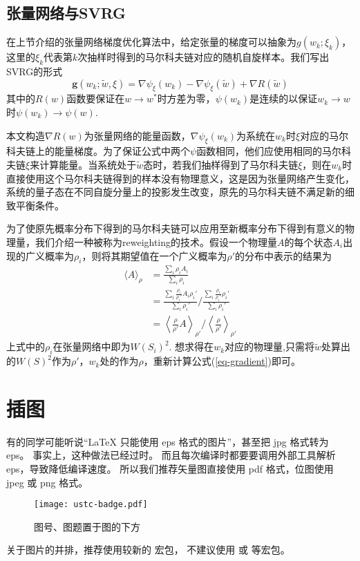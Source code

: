 \subsection{张量网络与SVRG}

在上节介绍的张量网络梯度优化算法中，给定张量的梯度可以抽象为$g(w_k;\xi_k)$，这里的$\xi_k$代表第$k$次抽样时得到的马尔科夫链对应的随机自旋样本。我们写出SVRG的形式
\begin{equation}\label{key}
\symbf{g}(w_k;\tilde{w},\xi)=\nabla\psi_{\xi}(w_{k})-\nabla\psi_{\xi}(\tilde{w}) + \nabla R(\tilde{w})
\end{equation}
其中的$R(w)$函数要保证在$w\to w^*$时方差为零，$\psi(w_k)$是连续的以保证$w_k\to w$时$\psi(w_k)\to\psi(w)$. 

本文构造$\nabla R(w)$为张量网络的能量函数，$\nabla\psi_{\xi}(w_k)$为系统在$w_k$时$\xi$对应的马尔科夫链上的能量梯度。为了保证公式中两个$\psi$函数相同，他们应使用相同的马尔科夫链$\xi$来计算能量。当系统处于$\tilde{w}$态时，若我们抽样得到了马尔科夫链$\xi$，则在$w_k$时直接使用这个马尔科夫链得到的样本没有物理意义，这是因为张量网络产生变化，系统的量子态在不同自旋分量上的投影发生改变，原先的马尔科夫链不满足新的细致平衡条件。

为了使原先概率分布下得到的马尔科夫链可以应用至新概率分布下得到有意义的物理量，我们介绍一种被称为reweighting的技术。假设一个物理量$A$的每个状态$A_i$出现的广义概率为$\rho_i$，则将其期望值在一个广义概率为$\rho'$的分布中表示的结果为
\begin{align*}
\langle A\rangle_\rho &= \frac{\sum_i \rho_i A_i}{\sum_i \rho_i}\\
		&= \frac{\sum_i \frac{\rho_i}{\rho_i'}A_i\rho_i'}{\sum_i \rho_i'}\Bigg/\frac{\sum_i \frac{\rho_i}{\rho_i'}\rho_i'}{\sum_i \rho_i'}\\
		&= \left\langle \frac{\rho}{\rho'}A\right\rangle_{\rho'} \Bigg/  \left\langle \frac{\rho}{\rho'}\right\rangle_{\rho'}
\end{align*}
上式中的$\rho_i$在张量网络中即为$W\!(S_i)^2$. 想求得在$w_k$对应的物理量,只需将$\tilde{w}$处算出的$W\!(S)^2$作为$\rho'$，$w_k$处的作为$\rho$，重新计算公式(\ref{eq-gradient})即可。




\section{插图}

有的同学可能听说“\LaTeX{} 只能使用 eps 格式的图片”，甚至把 jpg 格式转为 eps。
事实上，这种做法已经过时。
而且每次编译时都要要调用外部工具解析 eps，导致降低编译速度。
所以我们推荐矢量图直接使用 pdf 格式，位图使用 jpeg 或 png 格式。
\begin{figure}[htb]
  \centering
  \texttt{[image: ustc-badge.pdf]}
  \caption{图号、图题置于图的下方}
  \label{fig:badge}
\end{figure}

关于图片的并排，推荐使用较新的  宏包，
不建议使用  或  等宏包。

